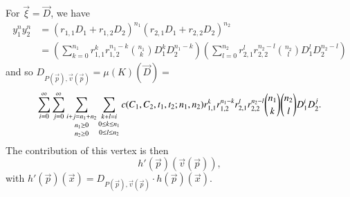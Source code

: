 For $\vec \xi = \vec D$, we have
\begin{align*}
y_1^n y_2^n
& =
\left( r_{1,1} D_1 + r_{1,2} D_2 \right)^{n_1}
\left( r_{2,1} D_1 + r_{2,2} D_2 \right)^{n_2}
\\
& =
\left(
\sum_{k=0}^{n_1} r_{1,1}^k r_{1,2}^{n_1 - k} { n_1 \choose k} D_1^k D_2^{n_1-k}
\right)
\left(
\sum_{l=0}^{n_2} r_{2,1}^l r_{2,2}^{n_2 - l} { n_2 \choose l} D_1^l D_2^{n_2-l}
\right)
\end{align*}
and so
$
D_{P(\vec p), \vec v(\vec p)} = \mu(K)(\vec D)
=
$
$$
\sum_{i=0}^\infty
\sum_{j=0}^\infty
\sum_{\shortstack{$\scriptstyle i+j = n_1+n_2$\\$\scriptstyle n_1 \ge 0$\\$\scriptstyle n_2 \ge 0$}}
\sum_{\shortstack{$\scriptstyle k+l = i$\\$\scriptstyle 0 \le k \le n_1$\\$\scriptstyle 0 \le l \le n_2$}}
c(C_1, C_2, t_1, t_2; n_1, n_2)
r_{1,1}^k r_{1,2}^{n_1 - k}
r_{2,1}^l r_{2,2}^{n_2 - l}
{ n_1 \choose k} { n_2 \choose l} D_1^i D_2^j
.
$$
The contribution of this vertex is then
$$
h'(\vec p)(\vec v(\vec p))
,
$$
with $
h'(\vec p)(\vec x) = D_{P(\vec p), \vec v(\vec p)} \cdot h(\vec p)(\vec x)
$.

